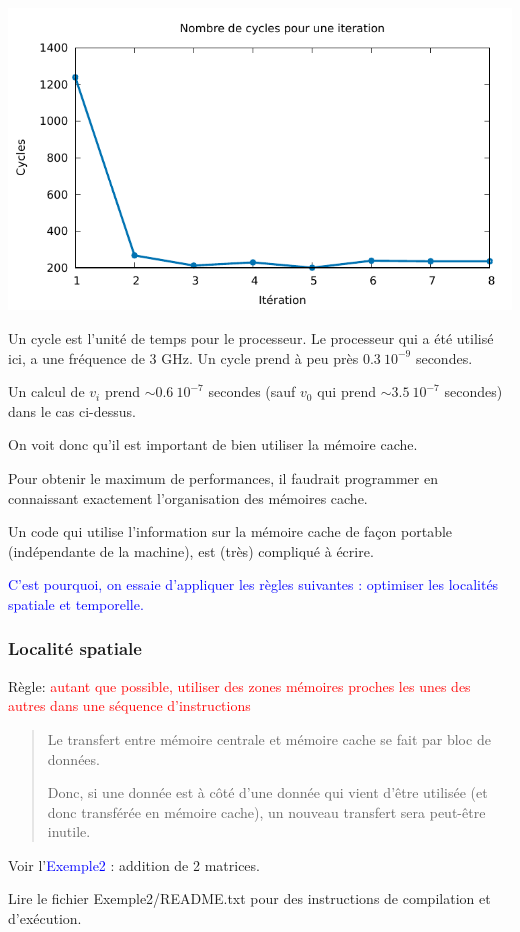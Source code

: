 \documentclass{beamer}
\begin{document}
\begin{frame}
	\begin{center}
	\includegraphics[scale=0.75]{Exemples1/Exemple1/cycles.pdf}
	\end{center}

Un cycle est l'unité de temps pour le processeur. Le processeur qui a été utilisé ici, a une fréquence de 3 GHz.
Un cycle prend à peu près $0.3\ 10^{-9}$ secondes. 
\vfill

Un calcul de $v_i$ prend $\sim 0.6\ 10^{-7}$ secondes (sauf $v_0$ qui prend $\sim 3.5\ 10^{-7}$ secondes) dans le cas ci-dessus.
\end{frame}

\begin{frame}
\vfill
On voit donc qu'il est important de bien utiliser la mémoire cache.
\vfill

Pour obtenir le maximum de performances, il faudrait programmer en connaissant exactement l'organisation des mémoires cache. 

Un code qui utilise l'information sur la mémoire cache de façon portable (indépendante de la machine), est (très) compliqué à écrire.

\vfill
   \textcolor{blue}{C'est pourquoi, on essaie d'appliquer les règles suivantes : optimiser les localités spatiale et temporelle.}
\vfill 
\end{frame}

\begin{frame}
\frametitle{Localit\'e spatiale}
Règle:  \textcolor{red}{autant que possible, utiliser des zones m\'emoires proches les unes des autres dans une s\'equence d'instructions}
	\vfill
\begin{quote}
	Le transfert entre m\'emoire centrale et m\'emoire cache se fait par bloc de donn\'ees.
	
	Donc, si une donn\'ee est \`a c\^ot\'e d'une donn\'ee qui vient d'\^etre utilis\'ee (et donc transf\'er\'ee en m\'emoire cache), un nouveau transfert sera peut-\^etre inutile.
\end{quote}

\vfill
Voir l'\textcolor{blue}{Exemple2} : addition de 2 matrices.

Lire le fichier Exemple2/README.txt pour des instructions de compilation et d'exécution.
\end{frame}
\end{document}
